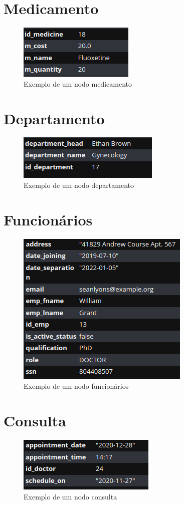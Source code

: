 \section{Medicamento}\label{secMedicamento}
\begin{figure}[H]
    \centering
    \includegraphics[width=0.3\linewidth]{Imagens/Neo4j/medicine.png}
    \caption{Exemplo de um nodo medicamento}
    \label{fig:nodo_medicamento}
\end{figure}

\section{Departamento}\label{secDepartamento}
\begin{figure}[H]
    \centering
    \includegraphics[width=0.3\linewidth]{Imagens/Neo4j/department.png}
    \caption{Exemplo de um nodo departamento}
    \label{fig:nodo_departamento}
\end{figure}

\section{Funcionários}\label{secFuncionarios}
\begin{figure}[H]
    \centering
    \includegraphics[width=0.3\linewidth]{Imagens/Neo4j/staff.png}
    \caption{Exemplo de um nodo funcionários}
    \label{fig:nodo_funcionarios}
\end{figure}

\section{Consulta}\label{secConsulta}
\begin{figure}[H]
    \centering
    \includegraphics[width=0.3\linewidth]{Imagens/Neo4j/appointment.png}
    \caption{Exemplo de um nodo consulta}
    \label{fig:nodo_consulta}
\end{figure}

